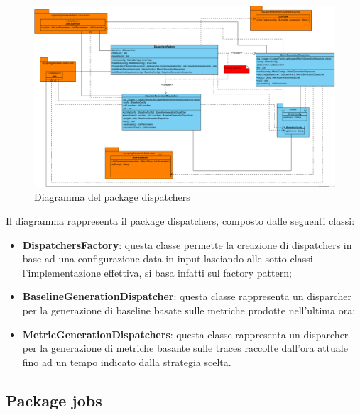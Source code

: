         \begin{figure}[htbp]
            \centering
            \includegraphics[width=\textwidth]{./img/DiagrammiClasse/dispatchers.png}
            \caption[Diagramma del package dispatchers]{Diagramma del package dispatchers}
        \end{figure}
        Il diagramma rappresenta il package dispatchers, composto dalle seguenti classi:
        \begin{itemize}
        	\item \textbf{DispatchersFactory}: questa classe permette la creazione di dispatchers in base ad una
        		configurazione data in input lasciando alle sotto-classi l'implementazione effettiva, si basa infatti
        		sul factory pattern;
        	\item \textbf{BaselineGenerationDispatcher}: questa classe rappresenta un disparcher per la generazione
        		di baseline basate sulle metriche prodotte nell'ultima ora;
        	\item \textbf{MetricGenerationDispatchers}: questa classe rappresenta un disparcher per la generazione
        		di metriche basante sulle traces raccolte dall'ora attuale fino ad un tempo indicato dalla strategia
        		scelta.
        \end{itemize}
\newpage

    \subsection{Package jobs}

